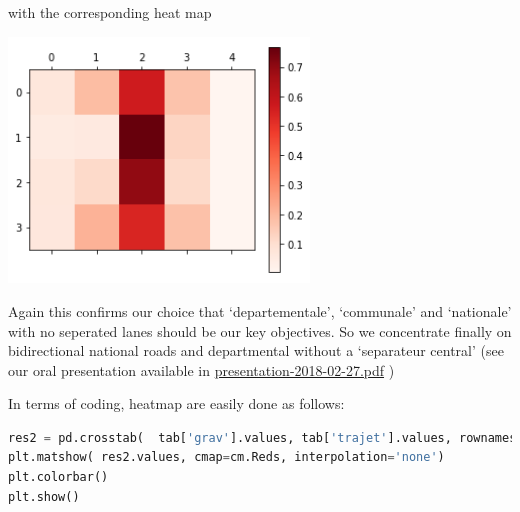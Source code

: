 \documentclass[a4paper]{article}
\theoremstyle{definition}
\theoremstyle{proposition}
\begin{document}
\label{cross_tab2}

with the corresponding heat map


\includegraphics[width=8cm]{heatmap_roads_category_circ.png}\label{heatmap_roads_category_circ}

Again this confirms our choice that `departementale', `communale' and `nationale' with no seperated lanes should be our key objectives. So we concentrate finally on bidirectional national roads and departmental without a `separateur central' (see our oral presentation available in \href{https://github.com/ericbenhamou/MASH_IPJ_2018/blob/master/presentation/presentation-2018-02-27.pdf}{presentation-2018-02-27.pdf} )

\newpage

In terms of coding, heatmap are easily done as follows:

\begin{lstlisting}[language=Python]
res2 = pd.crosstab(  tab['grav'].values, tab['trajet'].values, rownames =['gravite'],...)
plt.matshow( res2.values, cmap=cm.Reds, interpolation='none')
plt.colorbar()
plt.show()
\end{lstlisting}
\end{document}
